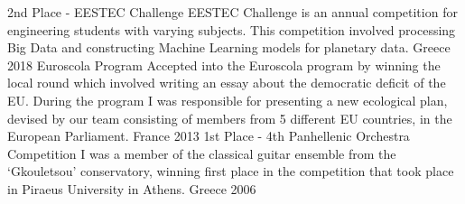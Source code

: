 


\begin{cvhonors}

  \cvhonor
    {2nd Place - EESTEC Challenge} %
    {EESTEC Challenge is an annual competition for engineering students with varying subjects.
    This competition involved processing Big Data and constructing Machine Learning models for planetary data.} %
    {Greece} %
    {2018} %
  \cvhonor
    {Euroscola Program} %
    {Accepted into the Euroscola program by winning the local round which involved writing an essay about the democratic deficit of the EU.
    During the program I was responsible for presenting a new ecological plan, devised by our team consisting of members from 5 different EU countries, in the European Parliament.} %
    {France} %
    {2013} %
  \cvhonor
    {1st Place - 4th Panhellenic Orchestra Competition} %
    {I was a member of the classical guitar ensemble from the ‘Gkouletsou’ conservatory, winning first place in the competition that took place in Piraeus University in Athens.} %
    {Greece} %
    {2006} %
\end{cvhonors}